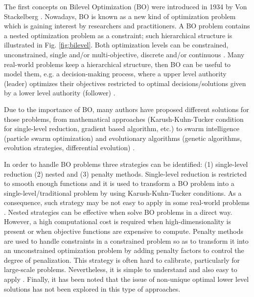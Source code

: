 \documentclass[conference]{IEEEtran}
\theoremstyle{definition}
\begin{document}
The first concepts on Bilevel Optimization (BO) were introduced in 1934 by Von
Stackelberg \cite{von2010market}. Nowadays, BO is known as a new kind of optimization
problem which is gaining interest by researchers and practitioners. A BO problem
contains a nested optimization problem as a constraint; such hierarchical structure
is illustrated in Fig. \ref{fig:bilevel}. Both optimization levels can be constrained,
unconstrained, single and/or multi-objective, discrete and/or continuous
\cite{bard2013practical,dempe2002foundations}. Many real-world problems keep a hierarchical
structure, then BO can be useful to model them, e.g. a decision-making process,
where a upper level authority (leader) optimizes their objectives restricted to
optimal decisions/solutions given by a  lower level authority (follower)
\cite{brotcorne2001bilevel,kalashnikov2010comparison,sinha2015transportation,von1945theory,wang2014bilevel}.

Due to the importance of BO, many authors have proposed different solutions
for those problems, from mathematical approaches (Karush-Kuhn-Tucker condition for
single-level reduction, gradient based algorithm, etc.) \cite{dempe2002foundations,shi2005extended}
to swarm intelligence (particle swarm optimization) and evolutionary algorithms
(genetic algorithms, evolution strategies, differential evolution)
\cite{derrac2011practical,angelo2013differential,li2006hierarchical}.

In order to handle BO problems three strategies can be identified: (1) single-level
reduction (2) nested and (3) penalty methods. Single-level reduction is restricted
to smooth enough functions and it is used to transform a BO problem into a single-level/traditional
problem by using Karush-Kuhn-Tucker conditions. As a consequence, such strategy
may be not easy to apply in some real-world problems  \cite{dempe2002foundations,colson2007overview}. %
Nested strategies can be effective when solve BO problems in a direct way. However, 
a high computational cost is required when high-dimensionality is present or when
objective functions are expensive to compute. Penalty methods are used to handle
constraints in a constrained problem so as to transform it into an unconstrained
optimization problem by adding penalty factors to control the degree of penalization.
This strategy is often hard to calibrate, particularly for large-scale problems.
Nevertheless, it is simple to understand and also easy to apply \cite{savard1994steepest,white1993penalty}.
Finally, it has been noted that the issue of non-unique optimal lower level
solutions has not been explored in this type of approaches.
\end{document}
